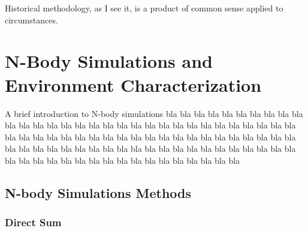 

\begin{savequote}[50mm]
Historical methodology, as I see it, is a product of common sense applied to circumstances. 
\end{savequote}

\chapter{N-Body Simulations and Environment Characterization}
\label{cha:N-BodySimulationsAndEnvironmentCharacterization}

\ifpdf
    \graphicspath{{3_overall_methodology/figures/PNG/}{3_overall_methodology/figures/PDF/}{3_overall_methodology/figures/}}
\else
    \graphicspath{{3_overall_methodology/figures/EPS/}{3_overall_methodology/figures/}}
\fi


A brief introduction to N-body simulations 
bla bla bla bla bla bla bla bla bla bla bla bla bla bla bla bla bla bla 
bla bla bla bla bla bla bla bla bla bla bla bla bla bla bla bla bla bla 
bla bla bla bla bla bla bla bla bla bla bla bla bla bla bla bla bla bla 
bla bla bla bla bla bla bla bla bla bla bla bla bla bla bla bla bla bla 
bla bla bla bla bla bla bla bla bla bla bla bla bla bla bla bla bla bla 



\section{N-body Simulations Methods}
\label{sec:N-bodySimulationsMethods}


	\subsection{Direct Sum}
	\label{subsec:DirectSum}


